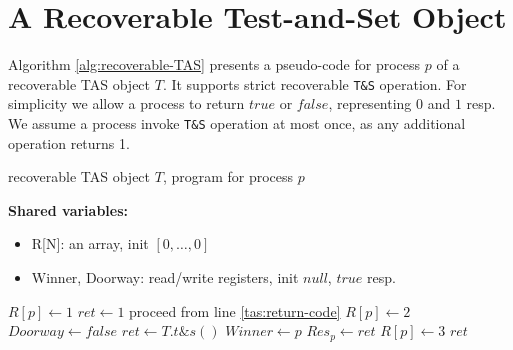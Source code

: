 
\section{A Recoverable Test-and-Set Object}



Algorithm \ref{alg:recoverable-TAS} presents a pseudo-code for process $p$ of a recoverable TAS object $T$. It supports strict recoverable \texttt{T\&S} operation.
For simplicity we allow a process to return $true$ or $false$, representing $0$ and $1$ resp. We assume a process invoke \texttt{T\&S} operation at most once, as any additional operation returns 1.


\begin{algorithm}%
	\caption{recoverable TAS object $T$, program for process $p$}
	\label{alg:recoverable-TAS}
	
	\hspace*{\algorithmicindent} \textbf{Shared variables:}
	\begin{itemize}[noitemsep,topsep=0pt]
		\item R[N]: an array, init $[0,\ldots,0]$
		\item Winner, Doorway: read/write registers, init $null$, $true$ resp.
	\end{itemize}
	
	\begin{multicols}{2}
	\begin{algorithmic}[1]
		\State $R[p] \gets 1$ \label{tas:start}
		 \label{tas:check-doorway}
			\State $ret \gets 1$ \label{tas:doorway-return-1}
			\State proceed from line \ref{tas:return-code}
		\EndIf
		\State $R[p] \gets 2$ \label{tas:set-R[p]-2}
		\State $Doorway \gets false$ \label{tas:close-doorway}
		\State $ret \gets T.t\&s()$ \label{tas:tas-primitive}
			\State $Winner \gets p$ \label{tas:write-to-winner}
		\EndIf
		\State $Res_p \gets ret$ \label{tas:return-code}
		\State $R[p] \gets 3$ \label{tas:set-R[p]-3}
		\State \Return $ret$
		\EndProcedure
		
		\columnbreak
		

\end{algorithmic}
\end{multicols}
\end{algorithm}
